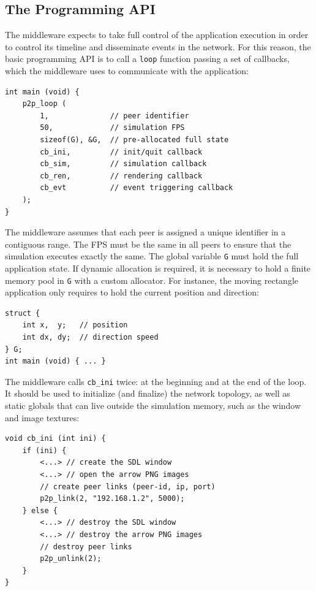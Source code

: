\documentclass[10pt,journal,compsoc]{IEEEtran}
\newcommand{\code}[1]  {\texttt{\footnotesize{#1}}}
\begin{document}
\subsection{The Programming API}
\label{sec.tml.api}

The middleware expects to take full control of the application execution in
order to control its timeline and disseminate events in the network.
For this reason, the basic programming API is to call a \code{loop} function
passing a set of callbacks, which the middleware uses to communicate with the
application:

{\footnotesize
\begin{verbatim}
int main (void) {
    p2p_loop (
        1,              // peer identifier
        50,             // simulation FPS
        sizeof(G), &G,  // pre-allocated full state
        cb_ini,         // init/quit callback
        cb_sim,         // simulation callback
        cb_ren,         // rendering callback
        cb_evt          // event triggering callback
    );
}
\end{verbatim}
}

The middleware assumes that each peer is assigned a unique identifier in a
contiguous range.
The FPS must be the same in all peers to ensure that the simulation executes
exactly the same.
The global variable \code{G} must hold the full application state.
If dynamic allocation is required, it is necessary to hold a finite memory
pool in \code{G} with a custom allocator.
For instance, the moving rectangle application only requires to hold the
current position and direction:

{\footnotesize
\begin{verbatim}
struct {
    int x,  y;   // position
    int dx, dy;  // direction speed
} G;
int main (void) { ... }
\end{verbatim}
}

The middleware calls \code{cb\_ini} twice: at the beginning and at the end of
the loop.
It should be used to initialize (and finalize) the network topology, as well
as static globals that can live outside the simulation memory, such as the
window and image textures:

{\footnotesize
\begin{verbatim}
void cb_ini (int ini) {
    if (ini) {
        <...> // create the SDL window
        <...> // open the arrow PNG images
        // create peer links (peer-id, ip, port)
        p2p_link(2, "192.168.1.2", 5000);
    } else {
        <...> // destroy the SDL window
        <...> // destroy the arrow PNG images
        // destroy peer links
        p2p_unlink(2);
    }
}
\end{verbatim}
}
\end{document}
